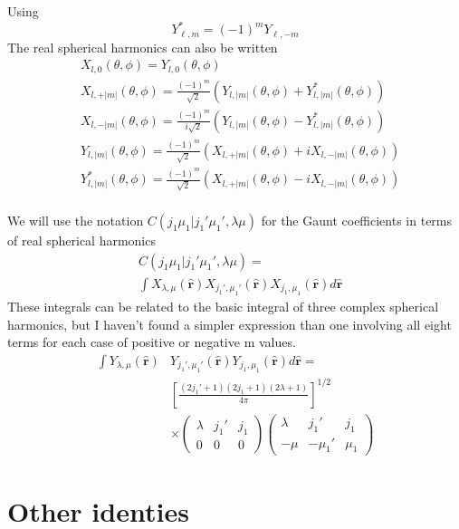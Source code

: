 \documentclass[%
pra%
,twocolumn%
,amssymb, nobibnotes, aps,
longbibliography
]{revtex4-1}
\begin{document}
Using
\begin{equation}
Y^*_{\ell,m} = (-1)^m Y_{\ell,-m} 
\end{equation}
The real spherical harmonics can also be written
\begin{equation}
\begin{split}
&X_{l,0}(\theta,\phi) = Y_{l,0}(\theta,\phi) \\
&X_{l,+|m|}(\theta,\phi) = \frac{(-1)^m}{\sqrt{2}} \left(Y_{l,|m|}(\theta,\phi) + Y^*_{l,|m|}(\theta,\phi) \right)\\
&X_{l,-|m|}(\theta,\phi) = \frac{(-1)^m}{i\sqrt{2}} \left(Y_{l,|m|}(\theta,\phi) -Y^*_{l,|m|}(\theta,\phi) \right)\\
& Y_{l,|m|}(\theta,\phi) = \frac{(-1)^m }{\sqrt{2}} (X_{l,+|m|}(\theta,\phi)+i X_{l,-|m|}(\theta,\phi)) \\
& Y^*_{l,|m|}(\theta,\phi) = \frac{(-1)^m}{\sqrt{2}}  (X_{l,+|m|}(\theta,\phi)-iX_{l,-|m|}(\theta,\phi)) \\
\end{split}
\end{equation}

We will use the notation
$C(j_1\mu_1|j_1'\mu_1',\lambda \mu)$ for the Gaunt coefficients 
in terms of real spherical harmonics
\begin{equation}
\begin{split}
& C(j_1\mu_1|j_1'\mu_1',\lambda \mu) = \\
& \int 
X_{\lambda,\mu} (\mathbf{\hat{r}})
X_{j_1',\mu_1'} (\mathbf{\hat{r}}) X_{j_1,\mu_1} (\mathbf{\hat{r}})
d\mathbf{\hat{r}}  
\end{split}
\end{equation}
These integrals can be related to the basic integral of three complex spherical
harmonics, but I haven't found a simpler expression than one involving all eight terms
for each case of positive or negative m values.
\begin{equation}
\begin{split}
 \int 
Y_{\lambda,\mu} (\mathbf{\hat{r}})&
Y_{j_1',\mu_1'} (\mathbf{\hat{r}})
Y_{j_1,\mu_1} (\mathbf{\hat{r}})
d\mathbf{\hat{r}}  = \\
&
\left[\frac{(2j_1' + 1)(2j_1+1)(2\lambda+1)}{4\pi}\right]^{1/2} \\
& \times 
\begin{pmatrix}
\lambda&j_1'&j_1\\
0&0&0
\end{pmatrix}
\begin{pmatrix}
\lambda&j_1'&j_1\\
-\mu&-\mu_1'&\mu_1
\end{pmatrix}
\end{split}
\end{equation}


\section{Other identies}

%
\end{document}
